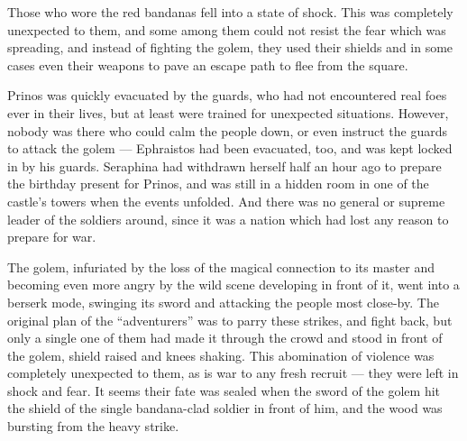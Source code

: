 Those who wore the red bandanas fell into a state of shock. This was completely unexpected to them, and some among them could not resist the fear which was spreading, and instead of fighting the golem, they used their shields and in some cases even their weapons to pave an escape path to flee from the square.

Prinos was quickly evacuated by the guards, who had not encountered real foes ever in their lives, but at least were trained for unexpected situations. However, nobody was there who could calm the people down, or even instruct the guards to attack the golem --- Ephraistos had been evacuated, too, and was kept locked in by his guards. Seraphina had withdrawn herself half an hour ago to prepare the birthday present for Prinos, and was still in a hidden room in one of the castle's towers when the events unfolded. And there was no general or supreme leader of the soldiers around, since it was a nation which had lost any reason to prepare for war.

The golem, infuriated by the loss of the magical connection to its master and becoming even more angry by the wild scene developing in front of it, went into a berserk mode, swinging its sword and attacking the people most close-by. The original plan of the \enquote{adventurers} was to parry these strikes, and fight back, but only a single one of them had made it through the crowd and stood in front of the golem, shield raised and knees shaking. This abomination of violence was completely unexpected to them, as is war to any fresh recruit --- they were left in shock and fear. It seems their fate was sealed when the sword of the golem hit the shield of the single bandana-clad soldier in front of him, and the wood was bursting from the heavy strike.

